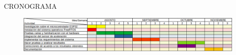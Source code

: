 \documentclass{article}
\begin{document}
    \begin{center}
        {\huge{CRONOGRAMA}}
    \end{center}

    \begin{figure}[h]
        \includegraphics[angle=90, width=0.2 \textwidth, center]{cronograma.png}
    \end{figure} 
\end{document}
